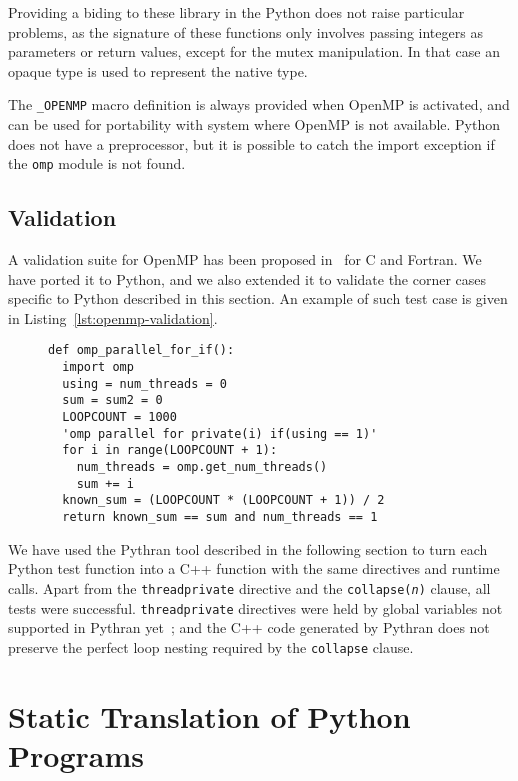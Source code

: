 \documentclass{llncs}
\begin{document}
Providing a biding to these library in the Python does not raise
particular problems, as the signature of these functions only involves passing
integers as parameters or return values, except for the mutex manipulation. In
that case an opaque type is used to represent the native type.

The \texttt{\_OPENMP} macro definition is always provided when OpenMP is
activated, and can be used for portability with system where OpenMP is not
available. Python does not have a preprocessor, but it is possible to catch the
import exception if the \texttt{omp} module is not found.

\subsection{Validation}

A validation suite for OpenMP has been proposed in~\cite{wang2012} for C and
Fortran. We have ported it to Python, and we also extended it to validate the
corner cases specific to Python described in this section. An example of such
test case is given in Listing~\ref{lst:openmp-validation}.

\begin{figure}
    \begin{lstlisting}[label={lst:openmp-validation},caption={Example of Python
    OpenMP validation test case.}]
def omp_parallel_for_if():
  import omp
  using = num_threads = 0
  sum = sum2 = 0
  LOOPCOUNT = 1000
  'omp parallel for private(i) if(using == 1)'
  for i in range(LOOPCOUNT + 1):
    num_threads = omp.get_num_threads()
    sum += i
  known_sum = (LOOPCOUNT * (LOOPCOUNT + 1)) / 2
  return known_sum == sum and num_threads == 1
    \end{lstlisting}
\end{figure}

We have used the Pythran tool described in the following section to turn each
Python test function into a C++ function with the same directives and runtime
calls. Apart from the \texttt{threadprivate} directive and the
\texttt{collapse(\emph{n})} clause, all tests were successful.
\texttt{threadprivate} directives were held by global variables not supported in
Pythran yet~; and the C++ code generated by Pythran does not preserve the perfect
loop nesting required by the \texttt{collapse} clause.

\section{Static Translation of Python Programs}\label{sec:python-static}
\end{document}
